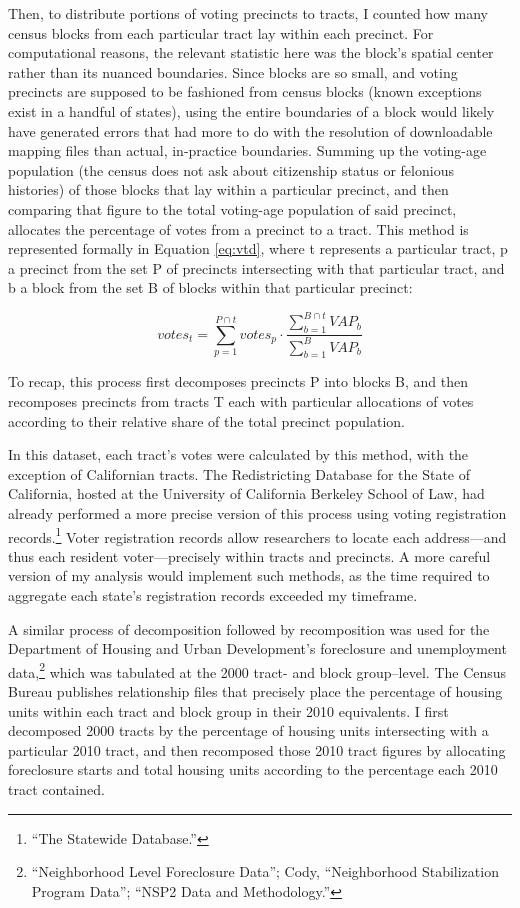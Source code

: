 \documentclass[
]{article}
\begin{document}
Then, to distribute portions of voting precincts to tracts, I counted how many census blocks from each particular tract lay within each precinct.
For computational reasons, the relevant statistic here was the block's spatial center rather than its nuanced boundaries.
Since blocks are so small, and voting precincts are supposed to be fashioned from census blocks (known exceptions exist in a handful of states), using the entire boundaries of a block would likely have generated errors that had more to do with the resolution of downloadable mapping files than actual, in-practice boundaries.
Summing up the voting-age population (the census does not ask about citizenship status or felonious histories) of those blocks that lay within a particular precinct, and then comparing that figure to the total voting-age population of said precinct, allocates the percentage of votes from a precinct to a tract.
This method is represented formally in Equation \eqref{eq:vtd}, where t represents a particular tract, p a precinct from the set P of precincts intersecting with that particular tract, and b a block from the set B of blocks within that particular precinct:

\begin{equation}
votes_{t} = \sum_{p=1}^{P \cap t} votes_p \cdot \frac{\sum_{b=1}^{B \cap t} VAP_b}{\sum_{b=1}^{B} VAP_b}
\label{eq:vtd}
\end{equation}

To recap, this process first decomposes precincts P into blocks B, and then recomposes precincts from tracts T each with particular allocations of votes according to their relative share of the total precinct population.

In this dataset, each tract's votes were calculated by this method, with the exception of Californian tracts.
The Redistricting Database for the State of California, hosted at the University of California Berkeley School of Law, had already performed a more precise version of this process using voting registration records.\footnote{``The Statewide Database.''}
Voter registration records allow researchers to locate each address---and thus each resident voter---precisely within tracts and precincts.
A more careful version of my analysis would implement such methods, as the time required to aggregate each state's registration records exceeded my timeframe.

A similar process of decomposition followed by recomposition was used for the Department of Housing and Urban Development's foreclosure and unemployment data,\footnote{``Neighborhood Level Foreclosure Data''; Cody, ``Neighborhood Stabilization Program Data''; ``NSP2 Data and Methodology.''} which was tabulated at the 2000 tract- and block group--level.
The Census Bureau publishes relationship files that precisely place the percentage of housing units within each tract and block group in their 2010 equivalents.
I first decomposed 2000 tracts by the percentage of housing units intersecting with a particular 2010 tract, and then recomposed those 2010 tract figures by allocating foreclosure starts and total housing units according to the percentage each 2010 tract contained.
\end{document}
